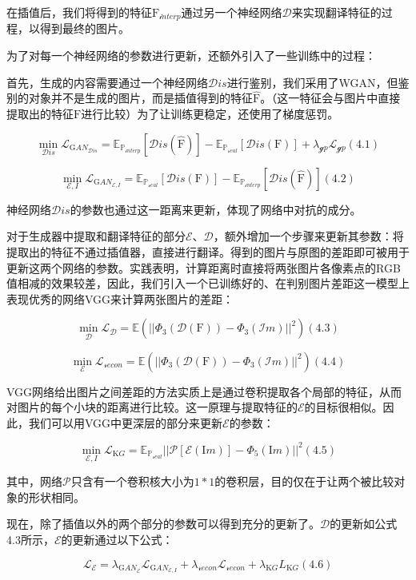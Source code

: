 \documentclass[UTF8,a4paper，12pt]{article}
\def\MC {\mathcal}
\theoremstyle{theorem}
\theoremstyle{definition}
\begin{document}
在插值后，我们将得到的特征$\mathrm F_{\MC interp}$通过另一个神经网络$\MC D$来实现翻译特征的过程，以得到最终的图片。

为了对每一个神经网络的参数进行更新，还额外引入了一些训练中的过程：

首先，生成的内容需要通过一个神经网络$\MC Dis$进行鉴别，我们采用了WGAN，但鉴别的对象并不是生成的图片，而是插值得到的特征$\hat{\mathrm F}$。（这一特征会与图片中直接提取出的特征$\mathrm F$进行比较）为了让训练更稳定，还使用了梯度惩罚。

$$\min_{\MC Dis} \MC L_{\mathrm GAN_{\MC Dis}} = \mathbb E_{\mathbb P_{\MC interp}}[\MC Dis(\hat{\mathrm F})] - \mathbb E_{\mathbb P_{\MC real}}[\MC Dis(\mathrm F)] + \lambda_{\MC gp}\MC L_{\MC gp}    (4.1)$$

$$\min_{\MC E,I} \MC L_{\mathrm GAN_{\MC E,I}} = \mathbb E_{\mathbb P_{\MC real}}[\MC Dis(\mathrm F)] - \mathbb E_{\mathbb P_{\MC interp}}[\MC Dis(\hat{\mathrm F})]    (4.2)$$

神经网络$\MC Dis$的参数也通过这一距离来更新，体现了网络中对抗的成分。

对于生成器中提取和翻译特征的部分$\MC E$、$\MC D$，额外增加一个步骤来更新其参数：将提取出的特征不通过插值器，直接进行翻译。得到的图片与原图的差距即可被用于更新这两个网络的参数。实践表明，计算距离时直接将两张图片各像素点的RGB值相减的效果较差，因此，我们引入一个已训练好的、在判别图片差距这一模型上表现优秀的网络VGG来计算两张图片的差距：

$$\min_{\MC D} \MC L_{\MC D} = \mathbb E(||\Phi_3(\MC D(\mathrm F)) - \Phi_3(\MC Im)||^2)    (4.3)$$

$$\min_{\MC E} \MC L_{\MC recon} = \mathbb E(||\Phi_3(\MC D(\mathrm F)) - \Phi_3(\MC Im)||^2)    (4.4)$$

VGG网络给出图片之间差距的方法实质上是通过卷积提取各个局部的特征，从而对图片的每个小块的距离进行比较。这一原理与提取特征的$\MC E$的目标很相似。因此，我们可以用VGG中更深层的部分来更新$\MC E$的参数：

$$\min_{\MC E,I} \MC L_{\mathrm KG} = \mathbb E_{\mathbb P_{\MC real}}||\MC P[\MC E(\mathrm Im)] - \Phi_5(\mathrm Im)||^2    (4.5)$$

其中，网络$\MC P$只含有一个卷积核大小为$1*1$的卷积层，目的仅在于让两个被比较对象的形状相同。

现在，除了插值以外的两个部分的参数可以得到充分的更新了。$\MC D$的更新如公式4.3所示，$\MC E$的更新通过以下公式：

$$\MC L_{\MC E} = \lambda_{\mathrm GAN_{\MC E}}\MC L_{\mathrm GAN_{\MC E,I}} + \lambda_{\MC recon}\MC L_{\MC recon} + \lambda_{\mathrm KG}L_{\mathrm KG}    (4.6)$$
\end{document}
